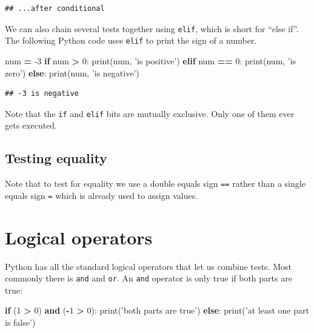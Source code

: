 \documentclass[]{book}
\newenvironment{Shaded}{\begin{snugshade}}{\end{snugshade}}
\newcommand{\BuiltInTok}[1]{#1}
\newcommand{\ControlFlowTok}[1]{\textcolor[rgb]{0.13,0.29,0.53}{\textbf{#1}}}
\newcommand{\DecValTok}[1]{\textcolor[rgb]{0.00,0.00,0.81}{#1}}
\newcommand{\KeywordTok}[1]{\textcolor[rgb]{0.13,0.29,0.53}{\textbf{#1}}}
\newcommand{\NormalTok}[1]{#1}
\newcommand{\OperatorTok}[1]{\textcolor[rgb]{0.81,0.36,0.00}{\textbf{#1}}}
\newcommand{\StringTok}[1]{\textcolor[rgb]{0.31,0.60,0.02}{#1}}
\theoremstyle{definition}
\theoremstyle{definition}
\theoremstyle{definition}
\theoremstyle{remark}
\begin{document}
\begin{verbatim}
## ...after conditional
\end{verbatim}

We can also chain several tests together using \texttt{elif}, which is
short for ``else if''. The following Python code uses \texttt{elif} to
print the sign of a number.

\begin{Shaded}
\begin{Highlighting}[]
\NormalTok{num }\OperatorTok{=} \DecValTok{-3}
\ControlFlowTok{if}\NormalTok{ num }\OperatorTok{>} \DecValTok{0}\NormalTok{:}
    \BuiltInTok{print}\NormalTok{(num, }\StringTok{'is positive'}\NormalTok{)}
\ControlFlowTok{elif}\NormalTok{ num }\OperatorTok{==} \DecValTok{0}\NormalTok{:}
    \BuiltInTok{print}\NormalTok{(num, }\StringTok{'is zero'}\NormalTok{)}
\ControlFlowTok{else}\NormalTok{:}
    \BuiltInTok{print}\NormalTok{(num, }\StringTok{'is negative'}\NormalTok{)}
\end{Highlighting}
\end{Shaded}

\begin{verbatim}
## -3 is negative
\end{verbatim}

Note that the \texttt{if} and \texttt{elif} bits are mutually exclusive.
Only one of them ever gets executed.

\hypertarget{testing-equality}{%
\subsection{Testing equality}\label{testing-equality}}

Note that to test for equality we use a double equals sign \texttt{==}
rather than a single equals sign \texttt{=} which is already used to
assign values.

\hypertarget{logical-operators}{%
\section{Logical operators}\label{logical-operators}}

Python has all the standard logical operators that let us combine tests.
Most commonly there is \texttt{and} and \texttt{or}. An \texttt{and}
operator is only true if both parts are true:

\begin{Shaded}
\begin{Highlighting}[]
\ControlFlowTok{if}\NormalTok{ (}\DecValTok{1} \OperatorTok{>} \DecValTok{0}\NormalTok{) }\KeywordTok{and}\NormalTok{ (}\OperatorTok{-}\DecValTok{1} \OperatorTok{>} \DecValTok{0}\NormalTok{):}
    \BuiltInTok{print}\NormalTok{(}\StringTok{'both parts are true'}\NormalTok{)}
\ControlFlowTok{else}\NormalTok{:}
    \BuiltInTok{print}\NormalTok{(}\StringTok{'at least one part is false'}\NormalTok{)}
\end{Highlighting}
\end{Shaded}
\end{document}
